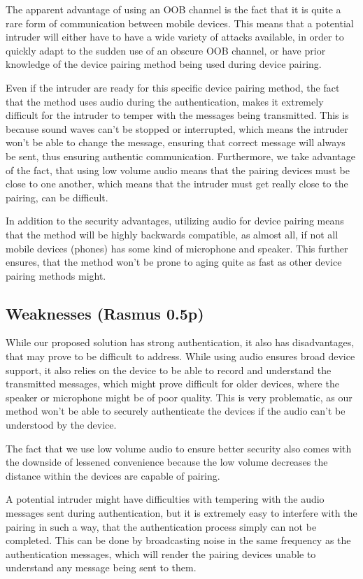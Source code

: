 \documentclass[12pt]{article}
\begin{document}
The apparent advantage of using an OOB channel is the fact that it is quite a rare form of communication between mobile devices. This means that a potential intruder will either have to have a wide variety of attacks available, in order to quickly adapt to the sudden use of an obscure OOB channel, or have prior knowledge of the device pairing method being used during device pairing.

Even if the intruder are ready for this specific device pairing method, the fact that the method uses audio during the authentication, makes it extremely difficult for the intruder to temper with the messages being transmitted. This is because sound waves can't be stopped or interrupted, which means the intruder won't be able to change the message, ensuring that correct message will always be sent, thus ensuring authentic communication. Furthermore, we take advantage of the fact, that using low volume audio means that the pairing devices must be close to one another, which means that the intruder must get really close to the pairing, can be difficult.

In addition to the security advantages, utilizing audio for device pairing means that the method will be highly backwards compatible, as almost all, if not all mobile devices (phones) has some kind of microphone and speaker. This further ensures, that the method won't be prone to aging quite as fast as other device pairing methods might.


\subsection{Weaknesses (Rasmus 0.5p)}
\label{sub:Weaknesses}

While our proposed solution has strong authentication, it also has disadvantages, that may prove to be difficult to address. While using audio ensures broad device support, it also relies on the device to be able to record and understand the transmitted messages, which might prove difficult for older devices, where the speaker or microphone might be of poor quality. This is very problematic, as our method won't be able to securely authenticate the devices if the audio can't be understood by the device.

The fact that we use low volume audio to ensure better security also comes with the downside of lessened convenience because the low volume decreases the distance within the devices are capable of pairing.

A potential intruder might have difficulties with tempering with the audio messages sent during authentication, but it is extremely easy to interfere with the pairing in such a way, that the authentication process simply can not be completed. This can be done by broadcasting noise in the same frequency as the authentication messages, which will render the pairing devices unable to understand any message being sent to them.
\end{document}
